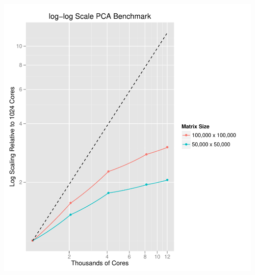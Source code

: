 \begin{frame}
  \begin{block}{}
  \begin{center}
    \includegraphics[height=.88\textheight]{../common/pics/benchmarks/pca_scaling}
  \end{center}
  \end{block}
\end{frame}